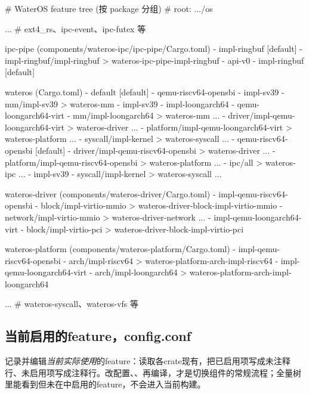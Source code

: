 \begin{textcode}
# WaterOS feature tree (按 package 分组)
# root: .../os

...                                    # ext4_rs、ipc-event、ipc-futex 等

ipc-pipe  (components/wateros-ipc/ipc-pipe/Cargo.toml)
  - impl-ringbuf [default]
    - impl-ringbuf/impl-ringbuf
      > wateros-ipc-pipe-impl-ringbuf
        - api-v0
        - impl-ringbuf [default]

wateros  (Cargo.toml)
  - default [default]
    - qemu-riscv64-opensbi
  - impl-sv39
    - mm/impl-sv39
      > wateros-mm
        - impl-sv39
        - impl-loongarch64
  - qemu-loongarch64-virt
    - mm/impl-loongarch64
      > wateros-mm ...
    - driver/impl-qemu-loongarch64-virt
      > wateros-driver ...
    - platform/impl-qemu-loongarch64-virt
      > wateros-platform ...
    - syscall/impl-kernel
      > wateros-syscall ...
  - qemu-riscv64-opensbi [default]
    - driver/impl-qemu-riscv64-opensbi
      > wateros-driver ...
    - platform/impl-qemu-riscv64-opensbi
      > wateros-platform ...
    - ipc/all
      > wateros-ipc ...
    - impl-sv39
    - syscall/impl-kernel
      > wateros-syscall ...

wateros-driver  (components/wateros-driver/Cargo.toml)
  - impl-qemu-riscv64-opensbi
    - block/impl-virtio-mmio
      > wateros-driver-block-impl-virtio-mmio
    - network/impl-virtio-mmio
      > wateros-driver-network ...
  - impl-qemu-loongarch64-virt
    - block/impl-virtio-pci
      > wateros-driver-block-impl-virtio-pci

wateros-platform  (components/wateros-platform/Cargo.toml)
  - impl-qemu-riscv64-opensbi
    - arch/impl-riscv64
      > wateros-platform-arch-impl-riscv64
  - impl-qemu-loongarch64-virt
    - arch/impl-loongarch64
      > wateros-platform-arch-impl-loongarch64

...                                    # wateros-syscall、wateros-vfs 等
\end{textcode}


\subsection{当前启用的feature，config.conf}\label{sec:feature-config-conf}

记录并编辑\emph{当前实际使用}的feature：读取各crate现有，把已启用项写成未注释行、未启用项写成\code{\#}注释行。改配置、、再编译，才是切换组件的常规流程；全量树里能看到但未在中启用的feature，不会进入当前构建。

